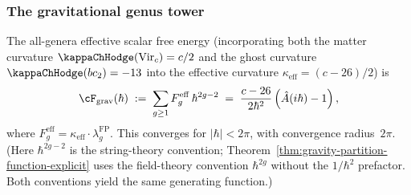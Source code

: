 \subsubsection*{The gravitational genus tower}

\begin{theorem}
\label{thm:gravity-genus-convergence}
The all-genera effective scalar free energy (incorporating both
the matter curvature $\kappaChHodge(\mathrm{Vir}_c) = c/2$ and the
ghost curvature $\kappaChHodge(bc_2) = -13$ into the effective
curvature $\kappa_{\mathrm{eff}} = (c-26)/2$) is
\begin{equation}\label{eq:gravity-all-genera}
\cF_{\mathrm{grav}}(\hbar)
\;:=\;
\sum_{g \ge 1}
F_g^{\mathrm{eff}}\,\hbar^{2g-2}
\;=\;
\frac{c-26}{2\hbar^2}
\left(
 \hat A(i\hbar) - 1
\right),
\end{equation}
where $F_g^{\mathrm{eff}} = \kappa_{\mathrm{eff}} \cdot
\lambda_g^{\mathrm{FP}}$. This
converges for $|\hbar| < 2\pi$, with convergence radius~$2\pi$.
\textup{(}Here $\hbar^{2g-2}$ is the string-theory convention;
Theorem~\textup{\ref{thm:gravity-partition-function-explicit}}
uses the field-theory convention $\hbar^{2g}$ without the
$1/\hbar^2$ prefactor. Both conventions yield the same generating
function.\textup{)}
\end{theorem}

